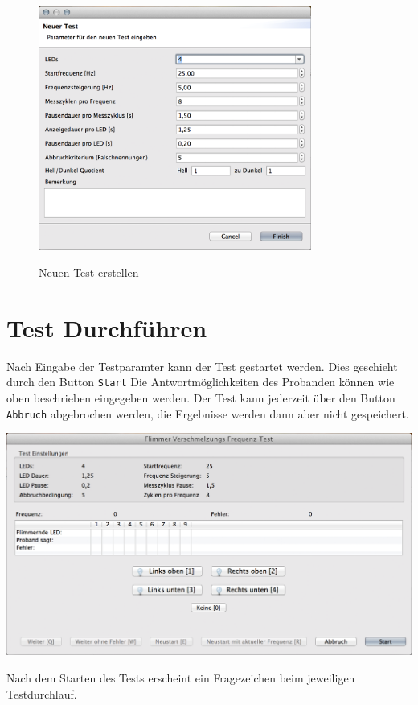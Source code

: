 \documentclass[11pt,accentcolor=tud2a,colorback,noheadingspace]{tudreport}
\begin{document}
\begin{figure}[H]
	\centering
	\includegraphics[width=0.8\textwidth]{test_dialog.png}
	\label{fig:test-new}
	\caption{Neuen Test erstellen}
\end{figure}

\section{Test Durchführen}
\label{tests:test-durchfuhren}\label{tests:test-run}
Nach Eingabe der Testparamter kann der Test gestartet werden. Dies geschieht durch den Button \texttt{Start} Die Antwortmöglichkeiten des Probanden können wie oben beschrieben eingegeben werden. Der Test kann jederzeit über den Button \texttt{Abbruch} abgebrochen werden, die Ergebnisse werden dann aber nicht gespeichert.

\includegraphics[width=\textwidth]{testrunner_dialog.png}

Nach dem Starten des Tests erscheint ein Fragezeichen beim jeweiligen Testdurchlauf.
\end{document}
